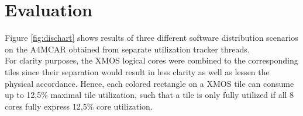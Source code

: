 \documentclass [a4paper,final,conference,10pt]{IDAACS}
\begin{document}

\section{Evaluation}
\label{sec:eval}
Figure \ref{fig:dischart} shows results of three different software distribution scenarios on the A4MCAR obtained from separate utilization tracker threads. \\
For clarity purposes, the XMOS logical cores were combined to the corresponding tiles since their separation would result in less clarity as well as lessen the physical accordance. Hence, each colored rectangle on a XMOS tile can consume up to 12,5\% maximal tile utilization, such that a tile is only fully utilized if all 8 cores fully express 12,5\% core utilization.
\end{document}
